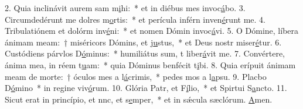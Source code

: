 2. Quia inclinávit aurem sam m\uline{i}hi:~* et in diébus mes invoc\uline{á}bo.
3. Circumdedérunt me dolres m\uline{o}rtis:~* et perícula inférn inven\uline{é}runt me.
4. Tribulatiónem et dolórm inv\uline{é}ni:~* et nomen Dómin invoc\uline{á}vi.
5. O Dómine, líbera ánimam meam:~† miséricors Dómins, et j\uline{u}stus,~* et Deus nostr miser\uline{é}tur.
6. Custódiens párvlos D\uline{ó}minus:~* humiliátus sum, t liber\uline{á}vit me.
7. Convértere, ánima mea, in réem t\uline{u}am:~* quia Dóminus benfécit t\uline{i}bi.
8. Quia erípuit ánimam meam de morte:~† óculos mes a l\uline{á}crimis,~* pedes mos a l\uline{a}psu.
9. Placbo D\uline{ó}mino~* in regine viv\uline{ó}rum.
10. Glória Patr, et F\uline{í}lio,~* et Spirtui S\uline{a}ncto.
11. Sicut erat in princípio, et nnc, et s\uline{e}mper,~* et in sǽcula sæclórum. \uline{A}men.
